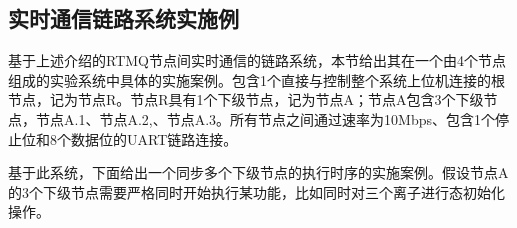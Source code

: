 













\subsection[实时通信链路系统实施例]{实时通信链路系统实施例}

基于上述介绍的RTMQ节点间实时通信的链路系统，本节给出其在一个由4个节点组成的实验系统中具体的实施案例。包含1个直接与控制整个系统上位机连接的根节点，记为节点R。节点R具有1个下级节点，记为节点A；节点A包含3个下级节点，节点A.1、节点A.2,、节点A.3。所有节点之间通过速率为10Mbps、包含1个停止位和8个数据位的UART链路连接。

基于此系统，下面给出一个同步多个下级节点的执行时序的实施案例。假设节点A的3个下级节点需要严格同时开始执行某功能，比如同时对三个离子进行态初始化操作。


